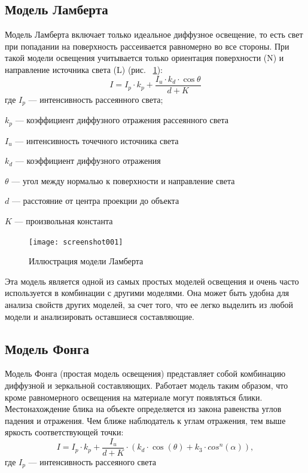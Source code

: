 \subsection*{Модель Ламберта}
	
	 Модель Ламберта включает только идеальное диффузное освещение, то есть свет при попадании на поверхность рассеивается равномерно во все стороны. При такой модели освещения учитывается только ориентация поверхности (N) и направление источника света (L) (рис. ~\ref{fig:screenshot001}):	
\begin{equation}
	I = I_{p} \cdot k_{p} + \dfrac{I_{u} \cdot k_{d} \cdot \cos\theta}{d + K}
\end{equation}
где 
	$I_{p}$ --- интенсивность рассеянного света;
	
	$k_{p}$ --- коэффициент диффузного отражения рассеянного света
	
	$I_{u}$ --- интенсивность точечного источника света
	
	$k_{d}$ --- коэффициент диффузного отражения
	
	$\theta$ --- угол между нормалью к поверхности и направление света
	
	$d$ --- расстояние от центра проекции до объекта
	
	$K$ --- произвольная константа

\newpage
\begin{figure}[h]
	\centering{}
	\texttt{[image: screenshot001]}
	\caption{Иллюстрация модели Ламберта}
	\label{fig:screenshot001}
\end{figure}

Эта модель является одной из самых простых моделей освещения и очень часто используется в комбинации с другими моделями. Она может быть удобна для анализа свойств других моделей, за счет того, что ее легко выделить из любой модели и анализировать оставшиеся составляющие.

\subsection* {Модель Фонга}

 Модель Фонга (простая модель освещения) представляет собой комбинацию диффузной и зеркальной составляющих. Работает модель таким образом, что кроме равномерного освещения на материале могут появляться блики. Местонахождение блика на объекте определяется из закона равенства углов падения и отражения. Чем ближе наблюдатель к углам отражения, тем выше яркость соответствующей точки: 
\begin{equation}
	I = I_{p}\cdot k_{p} + \dfrac{I_{u}}{d + K} \cdot(k_{d}\cdot\cos(\theta) + k_{3}\cdot cos^{n}(\alpha)),
\end{equation}
где
	$I_{p}$ --- интенсивность рассеяного света
	
